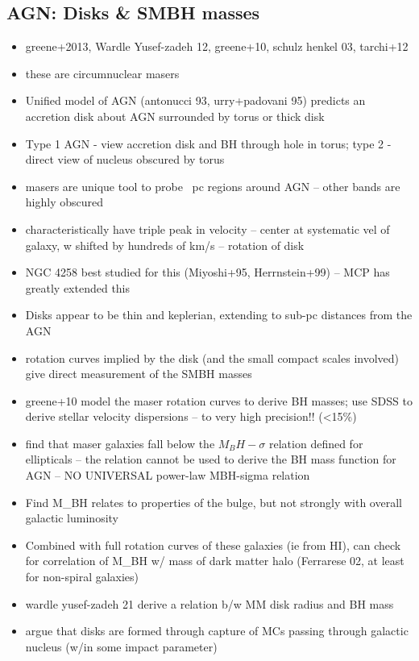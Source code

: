 \subsection{AGN: Disks \& SMBH masses}
\label{sub:h20_smbh_mass}

\begin{itemize}
\item greene+2013, Wardle Yusef-zadeh 12, greene+10, schulz henkel 03, tarchi+12
\item these are circumnuclear masers
\item Unified model of AGN (antonucci 93, urry+padovani 95) predicts an accretion disk about AGN surrounded by torus or thick disk
\item Type 1 AGN - view accretion disk and BH through hole in torus; type 2 - direct view of nucleus obscured by torus
\item masers are unique tool to probe ~pc regions around AGN -- other bands are highly obscured
\item characteristically have triple peak in velocity -- center at systematic vel of galaxy, w shifted by hundreds of km/s -- rotation of disk
\item NGC 4258 best studied for this  (Miyoshi+95, Herrnstein+99) -- MCP has greatly extended this
\item Disks appear to be thin and keplerian, extending to sub-pc distances from the AGN
\item rotation curves implied by the disk (and the small compact scales involved) give direct measurement of the SMBH masses
\item greene+10 model the maser rotation curves to derive BH masses; use SDSS to derive stellar velocity dispersions -- to very high precision!! (<15\%)
\item find that maser galaxies fall below the $M_BH-\sigma$ relation defined for ellipticals -- the relation cannot be used to derive the BH mass function for AGN -- NO UNIVERSAL power-law MBH-sigma relation
\item Find M_BH relates to properties of the bulge, but not strongly with overall galactic luminosity
\item Combined with full rotation curves of these galaxies (ie from HI), can check for correlation of M_BH w/ mass of dark matter halo (Ferrarese 02, at least for non-spiral galaxies)
\item wardle yusef-zadeh 21 derive a relation b/w MM disk radius and BH mass
\item argue that disks are formed through capture of MCs passing through galactic nucleus (w/in some impact parameter)

\end{itemize}
